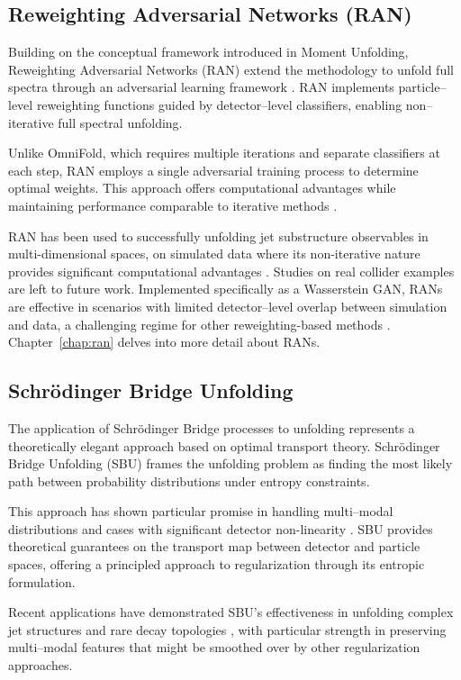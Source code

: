 \subsection{Reweighting Adversarial Networks (RAN)}

    Building on the conceptual framework introduced in Moment Unfolding, Reweighting Adversarial Networks (RAN) extend the methodology to unfold full spectra through an adversarial learning framework .
    RAN implements particle--level reweighting functions guided by detector--level classifiers, enabling non--iterative full spectral unfolding.

    Unlike OmniFold, which requires multiple iterations and separate classifiers at each step, RAN employs a single adversarial training process to determine optimal weights.
    This approach offers computational advantages while maintaining performance comparable to iterative methods .

    RAN has been used to successfully unfolding jet substructure observables in multi-dimensional spaces, on simulated data where its non-iterative nature provides significant computational advantages .
    Studies on real collider examples are left to future work.
    Implemented specifically as a Wasserstein GAN, RANs are effective in scenarios with limited detector--level overlap between simulation and data, a challenging regime for other reweighting-based methods .
    Chapter~\ref{chap:ran} delves into more detail about RANs.

\subsection{Schrödinger Bridge Unfolding}
    The application of Schrödinger Bridge processes to unfolding represents a theoretically elegant approach based on optimal transport theory.
    Schrödinger Bridge Unfolding (SBU)  frames the unfolding problem as finding the most likely path between probability distributions under entropy constraints.

    This approach has shown particular promise in handling multi--modal distributions and cases with significant detector non-linearity .
    SBU provides theoretical guarantees on the transport map between detector and particle spaces, offering a principled approach to regularization through its entropic formulation.

    Recent applications have demonstrated SBU's effectiveness in unfolding complex jet structures and rare decay topologies , with particular strength in preserving multi--modal features that might be smoothed over by other regularization approaches.
